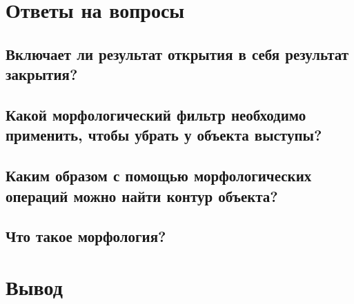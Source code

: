 \documentclass[a4paper, 12pt]{article}
\begin{document}
    \section{Ответы на вопросы}
    \subsection{Включает ли результат открытия в себя результат закрытия?}


    \subsection{Какой морфологический фильтр необходимо применить, чтобы убрать у объекта выступы?}


    \subsection{Каким образом с помощью морфологических операций можно найти контур объекта?}


    \subsection{Что такое морфология?}


    \section{Вывод}
\end{document}
